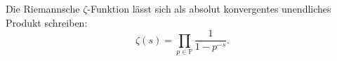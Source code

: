 \begin{frame}
    \begin{lemma}[Eulerprodukt]
        Die Riemannsche $\zeta$-Funktion lässt sich als absolut konvergentes unendliches Produkt schreiben:
    \[
        \zeta(s) = \prod_{p\in \mathbb{P}}\frac{1}{1-p^{-s}}.
    \]
    \end{lemma}
\end{frame}